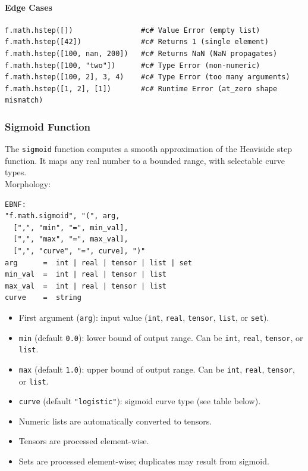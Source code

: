 \paragraph{Edge Cases}
\begin{verbatim}
f.math.hstep([])                #c# Value Error (empty list)
f.math.hstep([42])              #c# Returns 1 (single element)
f.math.hstep([100, nan, 200])   #c# Returns NaN (NaN propagates)
f.math.hstep([100, "two"])      #c# Type Error (non-numeric)
f.math.hstep([100, 2], 3, 4)    #c# Type Error (too many arguments)
f.math.hstep([1, 2], [1])       #c# Runtime Error (at_zero shape mismatch)
\end{verbatim}

\subsubsection{Sigmoid Function}
The \texttt{sigmoid} function computes a smooth approximation of the Heaviside step function. It maps any real number to a bounded range, with selectable curve types.\\
Morphology:
\begin{verbatim}
EBNF:
"f.math.sigmoid", "(", arg,
  [",", "min", "=", min_val],
  [",", "max", "=", max_val],
  [",", "curve", "=", curve], ")"
arg      =  int | real | tensor | list | set
min_val  =  int | real | tensor | list
max_val  =  int | real | tensor | list
curve    =  string
\end{verbatim}
\begin{itemize}
\item First argument (\texttt{arg}): input value (\texttt{int}, \texttt{real}, \texttt{tensor}, \texttt{list}, or \texttt{set}).
\item \texttt{min} (default \texttt{0.0}): lower bound of output range. Can be \texttt{int}, \texttt{real}, \texttt{tensor}, or \texttt{list}.
\item \texttt{max} (default \texttt{1.0}): upper bound of output range. Can be \texttt{int}, \texttt{real}, \texttt{tensor}, or \texttt{list}.
\item \texttt{curve} (default \texttt{"logistic"}): sigmoid curve type (see table below).
\item Numeric lists are automatically converted to tensors.
\item Tensors are processed element-wise.
\item Sets are processed element-wise; duplicates may result from sigmoid.
\end{itemize}

